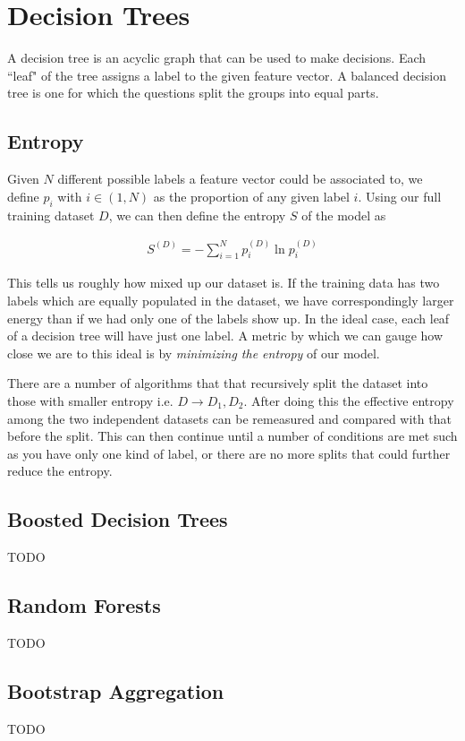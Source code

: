 \section{Decision Trees}
A decision tree is an acyclic graph that can be used to make decisions. Each ``leaf" of the tree assigns a label to the given feature vector. A balanced decision tree is one for which the questions split the groups into equal parts.

\subsection{Entropy}
Given $N$ different possible labels a feature vector could be associated to, we define $p_i$ with $i\in (1,N)$ as the proportion of any given label $i$. Using our full training dataset $D$, we can then define the entropy $S$ of the model as 

\begin{align}
	S^{(D)} = -\sum_{i=1}^N p^{(D)}_i\ln p^{(D)}_i
\end{align}

This tells us roughly how mixed up our dataset is. If the training data has two labels which are equally populated in the dataset, we have correspondingly larger energy than if we had only one of the labels show up. In the ideal case, each leaf of a decision tree will have just one label. A metric by which we can gauge how close we are to this ideal is by \emph{minimizing the entropy} of our model. 

There are a number of algorithms that that recursively split the dataset into those with smaller entropy i.e. $D\rightarrow D_1, D_2$. After doing this the effective entropy among the two independent datasets can be remeasured and compared with that before the split. This can then continue until a number of conditions are met such as you have only one kind of label, or there are no more splits that could further reduce the entropy.

\subsection{Boosted Decision Trees}
TODO
\subsection{Random Forests}
TODO
\subsection{Bootstrap Aggregation}
TODO


